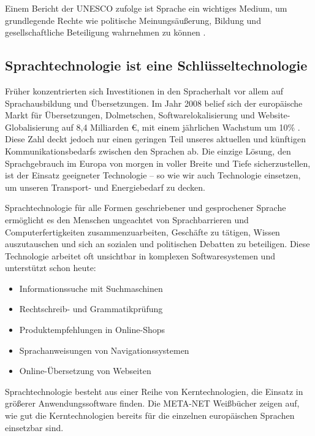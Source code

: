 \documentclass[]{../../metanetpaper}
\begin{document}
\begin{multicols}{2}
Einem Bericht der UNESCO zufolge ist Sprache ein wichtiges Medium, um grundlegende Rechte wie politische Meinungsäußerung, Bildung und gesellschaftliche Beteiligung wahrnehmen zu können \cite{Unesco1}.

\subsection{Sprachtechnologie ist eine Schlüsseltechnologie}

Früher konzentrierten sich Investitionen in den Sprach\-er\-halt vor allem auf Sprachausbildung und Übersetzungen. Im Jahr 2008 belief sich der europäische Markt für Übersetzungen, Dolmetschen, Softwarelokalisierung und Website-Globalisierung auf 8,4 Milliarden €, mit einem jährlichen Wachstum um 10\% \cite{EC3}. Diese Zahl deckt jedoch nur einen geringen Teil unseres aktuellen und künftigen Kommunikationsbedarfs zwischen den Sprachen ab. Die einzige Lösung, den Sprachgebrauch im Europa von morgen in voller Breite und Tiefe sicherzustellen, ist der Einsatz geeigneter Tech\-no\-lo\-gie -- so wie wir auch Technologie einsetzen, um unseren Transport- und Energiebedarf zu decken.

Sprachtechnologie für alle Formen geschriebener und gesprochener Sprache ermöglicht es den Menschen ungeachtet von Sprachbarrieren und Computerfertigkeiten zusammenzuarbeiten, Geschäfte zu tätigen, Wissen auszutauschen und sich an sozialen und politischen Debatten zu beteiligen. Diese Technologie arbeitet oft unsichtbar in komplexen Softwaresystemen und unterstützt schon heute:

\begin{itemize}
\item Informationssuche mit Suchmaschinen
\item Rechtschreib- und Grammatikprüfung
\item Produktempfehlungen in Online-Shops
\item Sprachanweisungen von Na\-vi\-ga\-tions\-sys\-te\-men
\item Online-Übersetzung von Webseiten 
\end{itemize}

Sprachtechnologie besteht aus einer Reihe von Kerntechnologien, die Einsatz in größerer Anwendungssoftware finden. Die META-NET Weißbücher zeigen auf, wie gut die Kerntechnologien bereits für die einzelnen europäischen Sprachen einsetzbar sind. 



\end{multicols}
\end{document}
